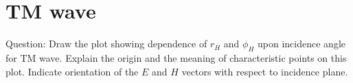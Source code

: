 \section{TM wave}
Question: Draw the plot showing dependence of $r_H$ and $\phi_H$ upon incidence angle for TM wave. Explain the origin and the meaning of characteristic points on this plot. Indicate orientation of the $E$ and $H$ vectors with respect to incidence plane.\bigskip

